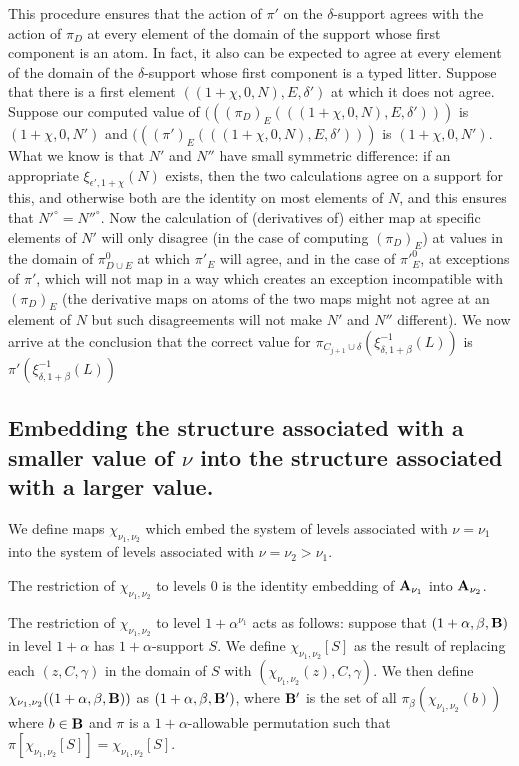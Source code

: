 \documentclass[12pt]{article}
\begin{document}
This procedure ensures
that the action of $\pi'$ on the $\delta$-support agrees with the action of $\pi_D$ at every element of the domain of the support whose first component is an atom.  In fact, it also can be expected to agree at every element of the domain of the $\delta$-support whose first component is a typed litter.   Suppose that there is a first element $((1+\chi,0,N),E,\delta')$ at which it does not agree.  Suppose our computed value of $(((\pi_D)_E(((1+\chi,0,N),E,\delta')))$ is $(1+\chi,0,N')$ and $(((\pi')_E(((1+\chi,0,N),E,\delta')))$ is $(1+\chi,0,N')$.  What we know is that $N'$ and $N''$ have small symmetric difference:  if an appropriate $\xi_{\epsilon',1+\chi}(N)$ exists, then the two calculations agree on a support for this, and otherwise
both are the identity on most elements of $N$, and this ensures that $N'^\circ = N''^\circ$.  Now the calculation of (derivatives of) either map at specific elements of $N'$ will only disagree (in the case of computing $(\pi_D)_E$) at values in the domain of $\pi^0_{D \cup E}$ at which $\pi'_E$ will agree, and in the case of $\pi'^0_E$, at exceptions of $\pi'$, which will not map in a way which creates an exception incompatible with $(\pi_D)_E$ (the derivative maps on atoms of the two maps might not agree at an element of $N$ but such disagreements will not make $N'$ and $N''$ different).  We now arrive at the conclusion that the correct value for $\pi_{C_{j+1}\cup \delta}(\xi_{\delta,1+\beta}^{-1}(L))$ is $\pi'(\xi_{\delta,1+\beta}^{-1}(L))$






\subsection{Embedding the structure associated with a smaller value of $\nu$ into the structure associated with a larger value.}

We define maps $\chi_{\nu_1,\nu_2}$ which embed the system of levels associated with $\nu=\nu_1$
into the system of levels associated with $\nu=\nu_2>\nu_1$.

The restriction of $\chi_{\nu_1,\nu_2}$ to levels 0 is the identity embedding of ${\bf A}_{\nu_1}$ into ${\bf A}_{\nu_2}$.

The restriction of $\chi_{\nu_1,\nu_2}$ to level $1+\alpha^{\nu_1}$ acts as follows:  suppose that \newline$(1+\alpha,\beta,{\bf B})$ in level $1+\alpha$ has $1+\alpha$-support $S$.  We define $\chi_{\nu_1,\nu_2}[S]$ as the result of replacing each $(z,C,\gamma)$ in the domain of $S$ with $(\chi_{\nu_1,\nu_2}(z),C,\gamma)$.  We then define $\chi_{\nu_1,\nu_2}((1+\alpha,\beta,{\bf B}))$ as $(1+\alpha,\beta,{\bf B}')$, where ${\bf B}'$ is the set of all $\pi_\beta(\chi_{\nu_1,\nu_2}(b))$ where $b \in {\bf B}$ and $\pi$ is a $1+\alpha$-allowable permutation such that $\pi[\chi_{\nu_1,\nu_2}[S]] = \chi_{\nu_1,\nu_2}[S]$.
\end{document}
